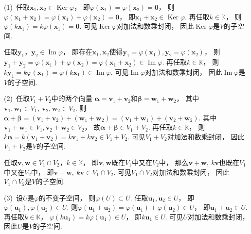 \begin{pf}

    (1)~任取$\bm{x}_1 , \bm{x}_2 \in \operatorname{Ker}\varphi$，
    即$\varphi (\bm{x}_1) = \varphi (\bm{x}_2) = \bm{0}$，
    则$\varphi (\bm{x}_1 + \bm{x}_2) = \varphi (\bm{x}_1) + \varphi (\bm{x}_2) = \bm{0}$，
    即$\bm{x}_1 + \bm{x}_2 \in \operatorname{Ker} \varphi$.
    再任取$k \in \mathbb{K}$，
    则$\varphi (k \bm{x}_1) = k \varphi(\bm{x}_1) = \bm{0}$.
    可见$\operatorname{Ker}\varphi$对加法和数乘封闭，
    因此$\operatorname{Ker}\varphi$是$V$的子空间.

    任取$\bm{y}_1 ， \bm{y}_2 \in \operatorname{Im} \varphi$，
    即存在$\bm{x}_1 , \bm{x}_2$使得$\bm{y}_1 = \varphi (\bm{x}_1), \bm{y}_2 = \varphi (\bm{x}_2)$，
    则$\bm{y}_1 + \bm{y}_2 = \varphi (\bm{x}_1 ) + \varphi (\bm{x}_2) = \varphi (\bm{x}_1 + \bm{x}_2) \in \operatorname{Im} \varphi$.
    再任取$k \in \mathbb{K}$，
    则$k\bm{y}_1 = k \varphi (\bm{x}_1) = \varphi (k \bm{x}_1) \in \operatorname{Im}\varphi$.
    可见$\operatorname{Im}\varphi$对加法和数乘封闭，
    因此$\operatorname{Im}\varphi$是$V$的子空间.

    \medskip

    (2)~任取$V_1 + V_2$中的两个向量
    $\bm{\alpha} = \bm{v}_1 + \bm{v}_2$和$\bm{\beta} = \bm{w}_1 + \bm{w}_2$，
    其中$\bm{v}_1 , \bm{w}_1 \in V_1, ~\bm{v}_2 , \bm{w}_2 \in V_2$.
    则$\bm{\alpha} + \bm{\beta} = (\bm{v}_1 + \bm{v}_2) + (\bm{w}_1 + \bm{w}_2) = (\bm{v}_1 + \bm{w}_1) + (\bm{v}_2 + \bm{w}_2)$.
    其中$\bm{v}_1 + \bm{w}_1 \in V_1 , \bm{v}_2 + \bm{w}_2 \in V_2$，
    故$\bm{\alpha} + \bm{\beta} \in V_1 + V_2$.
    再任取$k \in \mathbb{K}$，
    则$k\bm{\alpha} = k (\bm{v}_1 + \bm{v}_2) = k\bm{v}_1 + k \bm{v}_2 \in V_1 + V_2$.
    可见$V_1 + V_2$对加法和数乘封闭，
    因此$V_1 + V_2$是$V$的子空间.

    任取$\bm{v} , \bm{w} \in V_1 \cap V_2$，$k \in \mathbb{K}$，
    即$\bm{v}, \bm{w}$既在$V_1$中又在$V_2$中，
    那么$\bm{v} + \bm{w} ,~ k\bm{v}$也既在$V_1$中又在$V_2$中，
    即$\bm{v} + \bm{w} ,~ k\bm{v} \in V_1 \cap V_2$.
    可见$V_1 \cap V_2$对加法和数乘封闭，
    因此$V_1 \cap V_2$是$V$的子空间.

    \medskip

    (3)~设$U$是$\varphi$的不变子空间，
    则$\varphi (U) \subset U$.
    任取$\bm{u}_1 , \bm{u}_2 \in U$，
    即$\varphi (\bm{u}_1) , \varphi(\bm{u}_2) \in U $.
    则$\varphi (\bm{u}_1 + \bm{u}_2) = \varphi (\bm{u}_1) + \varphi (\bm{u}_2) \in U$，
    即$\bm{u}_1 + \bm{u}_2 \in U$.
    再任取$k \in \mathbb{K}$，
    $\varphi (k\bm{u}_1) = k \varphi (\bm{u}_1) \in U$，
    即$k\bm{u}_1 \in U$.
    可见$U$对加法和数乘封闭，
    因此$U$是$V$的子空间.
\end{pf}
